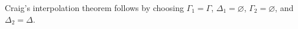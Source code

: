 \documentclass[a4paper]{article}
\begin{document}
\begin{itemize}
  Craig's interpolation theorem follows by choosing $\Gamma_1 = \Gamma$, $\Delta_1 = \varnothing$, $\Gamma_2 = \varnothing$, and $\Delta_2 = \Delta$.
\end{itemize}

% 
% 
\end{document}
